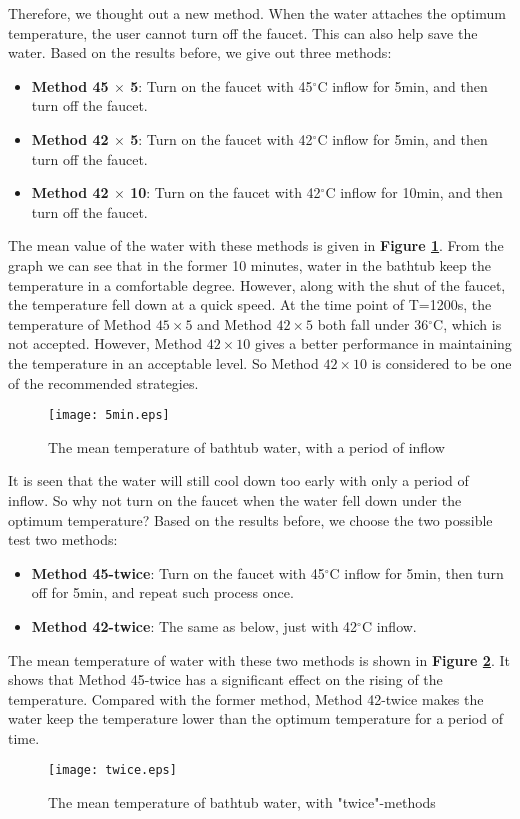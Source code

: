 \documentclass{HZNUMCM}
\begin{document}
Therefore, we thought out a new method. When the water attaches the optimum temperature, the user
cannot turn off the faucet. This can also help save the water. Based on the results before, we give
out three methods:
\begin{itemize}
    \item \textbf{Method 45 $\times$ 5}: Turn on the faucet with 45$^\circ$C inflow for 5min, and then
    turn off the faucet.
    \item \textbf{Method 42 $\times$ 5}: Turn on the faucet with 42$^\circ$C inflow for 5min, and then
    turn off the faucet.
    \item \textbf{Method 42 $\times$ 10}: Turn on the faucet with 42$^\circ$C inflow for 10min, and
    then turn off the faucet.
\end{itemize}

The mean value of the water with these methods is given in \textbf{Figure \ref{5m}}. From the graph
we can see that in the former 10 minutes, water in the bathtub keep the temperature in a comfortable
degree. However, along with the shut of the faucet, the temperature fell down at a quick speed. At
the time point of T=1200s, the temperature of Method $45\times5$ and Method $42\times5$ both fall
under 36$^\circ$C, which is not accepted. However, Method $42\times10$ gives a better performance in
maintaining the temperature in an acceptable level. So Method $42\times10$ is considered to be one
of the recommended strategies.
\begin{figure}[!htbp]
\small
\centering
\texttt{[image: 5min.eps]}
\caption{The mean temperature of bathtub water, with a period of inflow}\label{5m}
\end{figure}

It is seen that the water will still cool down too early with only a period of inflow. So why not
turn on the faucet when the water fell down under the optimum temperature? Based on the results
before, we choose the two possible test two methods:
\begin{itemize}
    \item \textbf{Method 45-twice}: Turn on the faucet with 45$^\circ$C inflow for 5min, then turn
    off for 5min, and repeat such process once.
    \item \textbf{Method 42-twice}: The same as below, just with 42$^\circ$C inflow.
\end{itemize}

The mean temperature of water with these two methods is shown in \textbf{Figure \ref{ts}}. It shows
that Method 45-twice has a significant effect on the rising of the temperature. Compared with the
former method, Method 42-twice makes the water keep the temperature lower than the optimum
temperature for a period of time.
\begin{figure}[!htbp]
    \small
    \centering
    \texttt{[image: twice.eps]}
    \caption{The mean temperature of bathtub water, with "twice"-methods}\label{ts}
\end{figure}
\end{document}

